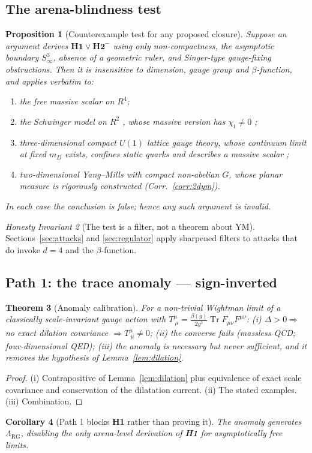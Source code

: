 \documentclass[11pt,a4paper]{article}
\def\R{R}\def\N{N}\def\Q{Q}\def\Z{Z}\def\Class{C}\def\OS{OS}\def\Gap{Gap}%
\theoremstyle{plain}
\newtheorem{theorem}{Theorem}[section]
\newtheorem{proposition}[theorem]{Proposition}
\newtheorem{corollary}[theorem]{Corollary}
\theoremstyle{definition}
\theoremstyle{remark}
\newtheorem{invariant}[theorem]{Honesty Invariant}
\newcommand{\R}{\mathbb{R}}\newcommand{\N}{\mathbb{N}}\newcommand{\Q}{\mathbb{Q}}
\newcommand{\Z}{\mathbb{Z}}\newcommand{\Spec}{\operatorname{Spec}}
\newcommand{\OS}{\mathrm{OS}}\newcommand{\Gap}{\mathrm{Gap}}
\newcommand{\Class}{\mathcal{C}}\newcommand{\Htot}{\mathcal{H}}
\newcommand{\Chit}{\chi_t}
\renewcommand{\_}{\oldunderscore\allowbreak}
\begin{document}
\subsection{The arena-blindness test}
\begin{proposition}[Counterexample test for any proposed closure]\label{prop:test}
Suppose an argument derives $\textbf{H1}\vee\textbf{H2}^-$ using only non-compactness, the
asymptotic boundary $S^3_\infty$, absence of a geometric ruler, and Singer-type gauge-fixing
obstructions. Then it is insensitive to dimension, gauge group and $\beta$-function, and applies
verbatim to:
\begin{enumerate}[label=(\roman*),leftmargin=22pt,itemsep=1pt]
\item the free massive scalar on $\R^4$;
\item the Schwinger model on $\R^2$ \cite{LowensteinSwieca1971}, whose massive version has
$\Chit\neq0$ \cite{Khlebnikov2006};
\item three-dimensional compact $U(1)$ lattice gauge theory, whose continuum limit at fixed
$m_D$ exists, confines static quarks and describes a massive scalar \cite{GoepfertMack1982};
\item two-dimensional Yang--Mills with compact non-abelian $G$, whose planar measure is
rigorously constructed \cite{SenguptaReview,AnshelevichSengupta2012} (Corr.~\ref{corr:2dym}).
\end{enumerate}
In each case the conclusion is false; hence any such argument is invalid.
\end{proposition}
\begin{invariant}[The test is a filter, not a theorem about YM]
Sections~\ref{sec:attacks} and \ref{sec:regulator} apply sharpened filters to attacks that do
invoke $d=4$ and the $\beta$-function.
\end{invariant}
\subsection{Path 1: the trace anomaly --- sign-inverted}
\begin{theorem}[Anomaly calibration]\label{thm:anomaly}
For a non-trivial Wightman limit of a classically scale-invariant gauge action with
$T^\mu_{\ \mu}=\frac{\beta(g)}{2g^3}\operatorname{Tr}F_{\mu\nu}F^{\mu\nu}$:
(i) $\Delta>0\Rightarrow$ no exact dilation covariance $\Rightarrow T^\mu_{\ \mu}\neq0$;
(ii) the converse fails (massless QCD; four-dimensional QED);
(iii) the anomaly is necessary but never sufficient, and it \emph{removes the hypothesis} of
Lemma~\ref{lem:dilation}.
\end{theorem}
\begin{proof}
(i) Contrapositive of Lemma~\ref{lem:dilation} plus equivalence of exact scale covariance and
conservation of the dilatation current. (ii) The stated examples. (iii) Combination.
\end{proof}
\begin{corollary}[Path 1 blocks \textbf{H1} rather than proving it]\label{cor:path1}
The anomaly \emph{generates} $\Lambda_{\mathrm{RG}}$, disabling the only arena-level derivation
of \textbf{H1} for asymptotically free limits.
\end{corollary}
\end{document}
